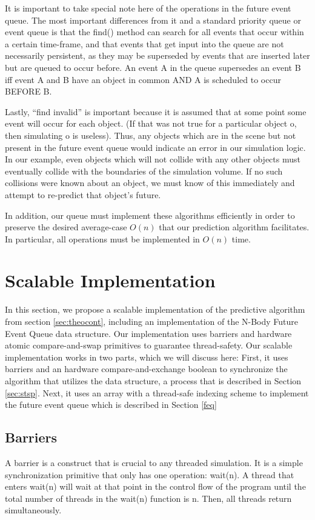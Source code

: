 \documentclass[CEJCS,PDF]{cej} %
\begin{document}
It is important to take special note here of the operations in the future event queue.  The most important differences from it and a standard priority queue or event queue
is that the find() method can search for all events that occur within a certain time-frame, and that events that get input into the queue are not necessarily persistent, as they 
may be superseded by events that are inserted later but are queued to occur before.  An event A in the queue supersedes an event B iff event A and B have an object in common AND A is scheduled to occur BEFORE B.

Lastly, ``find invalid'' is important because it is assumed that at some point some event will occur for each object. (If that was not true for a particular object o, then simulating o is 
useless).  Thus, any objects which are in the scene but not present in the future event queue would indicate an error in our simulation logic.  In our example, even objects which
will not collide with any other objects must eventually collide with the boundaries of the simulation volume.  If no such collisions were known about
an object, we must know of this immediately and attempt to re-predict that object's future.

In addition, our queue must implement these algorithms efficiently in order to preserve the desired average-case $O(n)$ that our prediction algorithm facilitates.  In particular, all operations must be implemented in $O(n)$ time.

\section{Scalable Implementation}
In this section, we propose a scalable implementation of the predictive algorithm from section \ref{sec:theocont}, including an implementation of the 
N-Body Future Event Queue data structure.  Our implementation uses barriers and hardware atomic compare-and-swap primitives to guarantee thread-safety.  Our scalable implementation
works in two parts, which we will discuss here:  First, it uses barriers and an hardware compare-and-exchange boolean to synchronize the algorithm that utilizes the data structure, 
a process that is described in Section \ref{sec:stsp}.  Next, it uses an array with a thread-safe indexing scheme to implement the future event queue which is described in Section \ref{feq}
\subsection{Barriers}
\label{sec:barrier}
A barrier is a construct that is crucial to any threaded simulation.  It is a simple synchronization primitive that only has one operation: wait(n).  
A thread that enters wait(n) will wait at that point in the control flow of the program until the total number of threads in the wait(n) function is n.  Then,
all threads return simultaneously.
\end{document}
